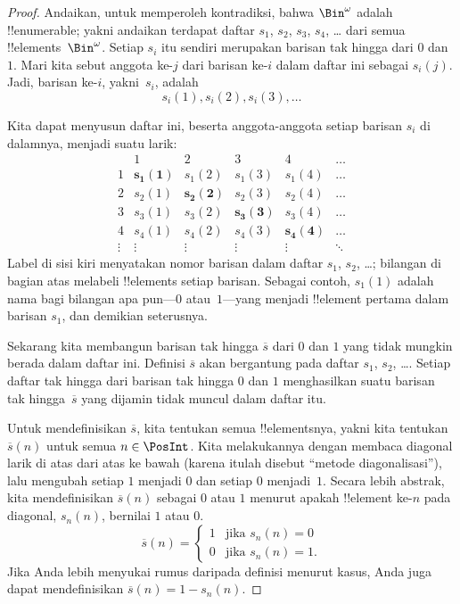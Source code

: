\documentclass[../../../include/open-logic-section]{subfiles}
\begin{document}
\begin{proof}
Andaikan, untuk memperoleh kontradiksi, bahwa $\Bin^\omega$ adalah
!!{enumerable}; yakni andaikan terdapat daftar $s_{1}$, $s_{2}$, $s_{3}$,
$s_{4}$, \dots{} dari semua !!{element}s~$\Bin^\omega$. Setiap $s_i$ itu
sendiri merupakan barisan tak hingga dari $0$ dan~$1$. Mari kita sebut anggota
ke-$j$ dari barisan ke-$i$ dalam daftar ini sebagai $s_i(j)$. Jadi, barisan
ke-$i$, yakni~$s_i$, adalah
\[
s_i(1), s_i(2), s_i(3), \dots
\]

Kita dapat menyusun daftar ini, beserta anggota-anggota setiap barisan $s_i$
di dalamnya, menjadi suatu larik:
\[
\begin{array}{c|c|c|c|c|c}
& 1 & 2 & 3 & 4 & \dots \\\hline
1 & \mathbf{s_{1}(1)} & s_{1}(2) & s_{1}(3) & s_1(4) & \dots \\\hline
2 & s_{2}(1)& \mathbf{s_{2}(2)} & s_2(3) & s_2(4) & \dots \\\hline
3 & s_{3}(1)& s_{3}(2) & \mathbf{s_3(3)} & s_3(4) & \dots \\\hline
4 & s_{4}(1)& s_{4}(2) & s_4(3) & \mathbf{s_4(4)} & \dots \\\hline
\vdots & \vdots & \vdots & \vdots & \vdots & \mathbf{\ddots}
\end{array}
\]
Label di sisi kiri menyatakan nomor barisan dalam daftar $s_1$, $s_2$,
\dots; bilangan di bagian atas melabeli !!{element}s setiap barisan. Sebagai
contoh, $s_{1}(1)$ adalah nama bagi bilangan apa pun---$0$ atau~$1$---yang
menjadi !!{element} pertama dalam barisan $s_{1}$, dan demikian seterusnya.

Sekarang kita membangun barisan tak hingga $\overline{s}$ dari $0$ dan $1$
yang tidak mungkin berada dalam daftar ini. Definisi $\overline{s}$ akan
bergantung pada daftar $s_1$, $s_2$, \dots. Setiap daftar tak hingga dari
barisan tak hingga $0$ dan $1$ menghasilkan suatu barisan
tak hingga~$\overline{s}$ yang dijamin tidak muncul dalam daftar itu.

Untuk mendefinisikan $\overline{s}$, kita tentukan semua !!{element}snya,
yakni kita tentukan $\overline{s}(n)$ untuk semua $n \in \PosInt$. Kita
melakukannya dengan membaca diagonal larik di atas dari atas ke bawah (karena
itulah disebut ``metode diagonalisasi''), lalu mengubah setiap $1$ menjadi $0$ dan
setiap $0$ menjadi~$1$. Secara lebih abstrak, kita mendefinisikan
$\overline{s}(n)$ sebagai $0$ atau $1$ menurut apakah !!{element} ke-$n$ pada
diagonal, $s_n(n)$, bernilai $1$ atau $0$.
\[
\overline{s}(n) =
\begin{cases}
1 & \text{jika $s_{n}(n) = 0$}\\
0 & \text{jika $s_{n}(n) = 1$}.
\end{cases}
\]
Jika Anda lebih menyukai rumus daripada definisi menurut kasus, Anda juga
dapat mendefinisikan $\overline{s}(n) = 1 - s_n(n)$.


\end{proof}
\end{document}

